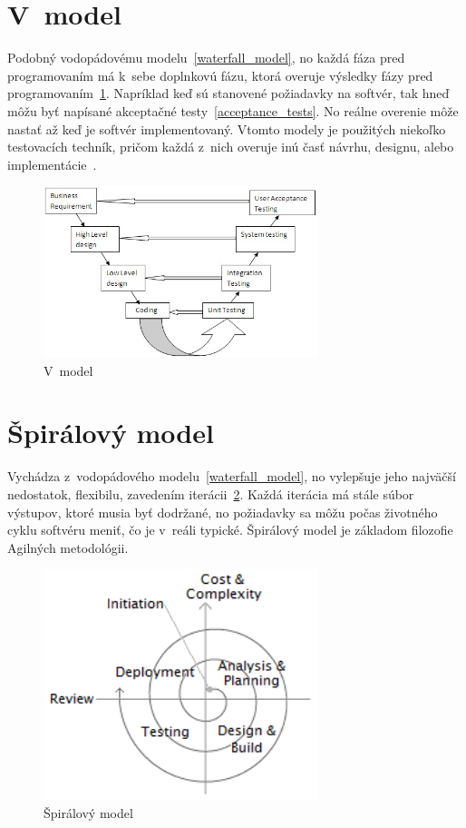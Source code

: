 \section{V~model}
\label{v_model}
Podobný vodopádovému modelu~\ref{waterfall_model}, no každá fáza pred programovaním má k~sebe doplnkovú fázu, ktorá overuje výsledky fázy pred programovaním~\ref{v_model_fig}.
Napríklad keď sú stanovené požiadavky na softvér, tak hneď môžu byť napísané akceptačné testy~\ref{acceptance_tests}.
No reálne overenie môže nastať až keď je softvér implementovaný.
Vtomto modely je použitých niekoľko testovacích techník, pričom každá z~nich overuje inú časť návrhu, designu, alebo implementácie~\cite{Patton}.
\begin{figure}[h]
\centering
\includegraphics[width=8cm,keepaspectratio=true]{obrazky/v_model.png}
\caption{V~model~\cite{models}}
\label{v_model_fig}
\end{figure}

\section{Špirálový model}
\label{spiral_model}
Vychádza z~vodopádového modelu~\ref{waterfall_model}, no vylepšuje jeho najväčší nedostatok, flexibilu, zavedením iterácii~\ref{spiral_model_fig}.
Každá iterácia má stále súbor výstupov, ktoré musia byť dodržané, no požiadavky sa môžu počas životného cyklu softvéru meniť, čo je v~reáli typické.
Špirálový model je základom filozofie Agilných metodológii.
\begin{figure}[h]
\centering
\includegraphics[width=8cm,keepaspectratio=true]{obrazky/spiral_model.png}
\caption{Špirálový model~\cite{models}}
\label{spiral_model_fig}
\end{figure}

